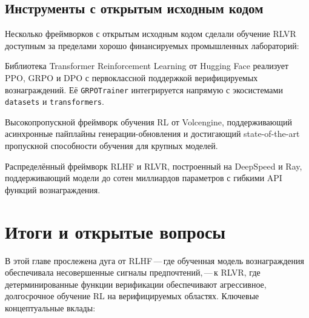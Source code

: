 \subsection{Инструменты с открытым исходным кодом}
\label{subsec:open-source-tooling}

Несколько фреймворков с открытым исходным кодом сделали обучение RLVR доступным
за пределами хорошо финансируемых промышленных лабораторий:

\begin{description}[leftmargin=!,labelwidth=2.5cm]
\item[TRL] Библиотека Transformer Reinforcement Learning от Hugging Face
  реализует PPO, GRPO и DPO с первоклассной поддержкой
  верифицируемых вознаграждений. Её \texttt{GRPOTrainer} интегрируется напрямую
  с экосистемами \texttt{datasets} и \texttt{transformers}.

\item[veRL] Высокопропускной фреймворк обучения RL от Volcengine,
  поддерживающий асинхронные пайплайны генерации-обновления и
  достигающий state-of-the-art пропускной способности обучения для крупных моделей.

\item[OpenRLHF] Распределённый фреймворк RLHF и RLVR, построенный на
  DeepSpeed и Ray, поддерживающий модели до сотен миллиардов
  параметров с гибкими API функций вознаграждения.
\end{description}

\section{Итоги и открытые вопросы}
\label{sec:reasoning-summary}

В этой главе прослежена дуга от RLHF\,---\,где обученная
модель вознаграждения обеспечивала несовершенные сигналы предпочтений,\,---\,к RLVR,
где детерминированные функции верификации обеспечивают агрессивное,
долгосрочное обучение RL на верифицируемых областях. Ключевые концептуальные
вклады:

